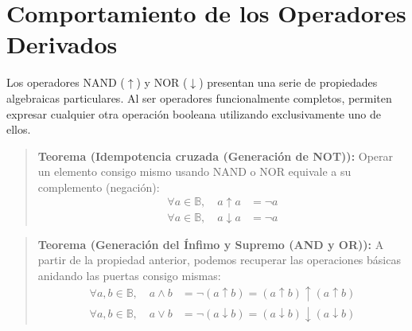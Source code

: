 \section{Comportamiento de los Operadores Derivados}
Los operadores NAND ($\uparrow$) y NOR ($\downarrow$) presentan una serie de propiedades algebraicas particulares. Al ser operadores funcionalmente completos, permiten expresar cualquier otra operación booleana utilizando exclusivamente uno de ellos.

\begin{quote}\textbf{Teorema (Idempotencia cruzada (Generación de NOT)):}\label{idemp_cruzada}
Operar un elemento consigo mismo usando NAND o NOR equivale a su complemento (negación):
\begin{align*}
    \forall a \in \mathbb{B}, \quad a \uparrow a &= \neg a \\
    \forall a \in \mathbb{B}, \quad a \downarrow a &= \neg a
\end{align*}
\end{quote}

\begin{quote}\textbf{Teorema (Generación del Ínfimo y Supremo (AND y OR)):}\label{gen_inf_sup}
A partir de la propiedad anterior, podemos recuperar las operaciones básicas anidando las puertas consigo mismas:
\begin{align*}
    \forall a, b \in \mathbb{B}, \quad a \wedge b &= \neg (a \uparrow b) = (a \uparrow b) \uparrow (a \uparrow b) \\
    \forall a, b \in \mathbb{B}, \quad a \vee b &= \neg (a \downarrow b) = (a \downarrow b) \downarrow (a \downarrow b)
\end{align*}
\end{quote}


